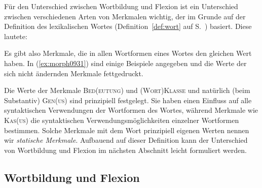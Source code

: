 \label{sec:inhmerk}

Für den Unterschied zwischen Wortbildung und Flexion ist ein Unterschied zwischen verschiedenen Arten von Merkmalen wichtig, der im Grunde auf der Definition des lexikalischen Wortes (Definition~\ref{def:wort} auf S.~\pageref{def:wort}) basiert.
Diese lautete:

\begin{quote}
  \DefWort
\end{quote}

Es gibt also Merkmale, die in allen Wortformen eines Wortes den gleichen Wert haben.
In (\ref{ex:morph0931}) sind einige Beispiele angegeben und die Werte der sich nicht ändernden Merkmale fettgedruckt.

\begin{exe}
  \ex \label{ex:morph0931}
  \begin{xlist}
  \end{xlist}
\end{exe}

Die Werte der Merkmale \textsc{Bed(eutung)} und \textsc{(Wort)Klasse} und natürlich (beim Substantiv) \textsc{Gen(us)} sind prinzipiell festgelegt.
Sie haben einen Einfluss auf alle syntaktischen Verwendungen der Wortformen des Wortes, während Merkmale wie \textsc{Kas(us)} die syntaktischen Verwendungsmöglichkeiten einzelner Wortformen bestimmen.
Solche Merkmale mit dem Wort prinzipiell eigenen Werten nennen wir \textit{statische Merkmale}.
Aufbauend auf dieser Definition kann der Unterschied von Wortbildung und Flexion im nächsten Abschnitt leicht formuliert werden.


\subsection{Wortbildung und Flexion}

